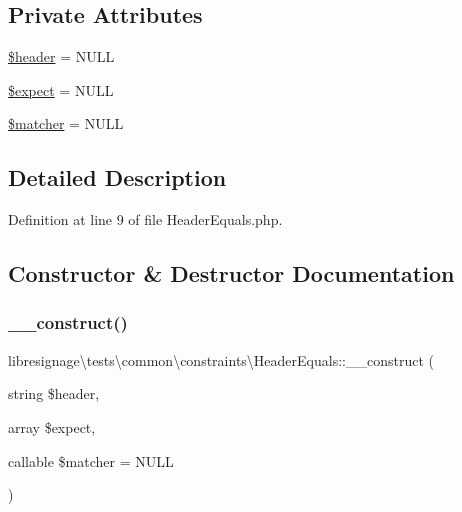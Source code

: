 \subsection*{Private Attributes}
\begin{DoxyCompactItemize}
\item 
\hyperlink{classlibresignage_1_1tests_1_1common_1_1constraints_1_1HeaderEquals_a3a7ab8cd517befe0390df6d857f11def}{\$header} = N\+U\+LL
\item 
\hyperlink{classlibresignage_1_1tests_1_1common_1_1constraints_1_1HeaderEquals_a555c4a16f1361a725e3b81570d5428ca}{\$expect} = N\+U\+LL
\item 
\hyperlink{classlibresignage_1_1tests_1_1common_1_1constraints_1_1HeaderEquals_a70c04f90a93576132e70f94f67aa3655}{\$matcher} = N\+U\+LL
\end{DoxyCompactItemize}


\subsection{Detailed Description}


Definition at line 9 of file Header\+Equals.\+php.



\subsection{Constructor \& Destructor Documentation}
\mbox{\label{classlibresignage_1_1tests_1_1common_1_1constraints_1_1HeaderEquals_a85f006fa3dea5678a0dfaebdd4d154c6}} 
\subsubsection{\texorpdfstring{\+\_\+\+\_\+construct()}{\_\_construct()}}
{\footnotesize\ttfamily libresignage\textbackslash{}tests\textbackslash{}common\textbackslash{}constraints\textbackslash{}\+Header\+Equals\+::\+\_\+\+\_\+construct (\begin{DoxyParamCaption}\item[{string}]{\$header,  }\item[{array}]{\$expect,  }\item[{callable}]{\$matcher = {\ttfamily NULL} }\end{DoxyParamCaption})}

